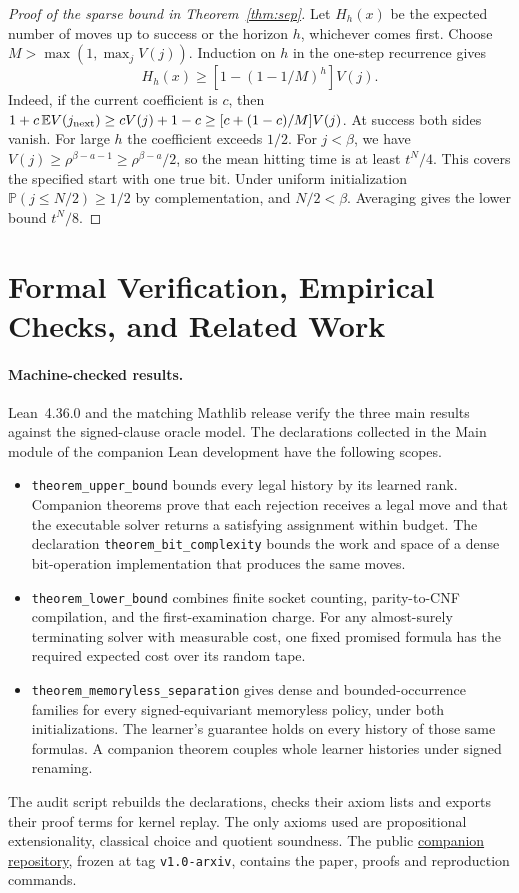 \documentclass[11pt,a4paper]{article}
\theoremstyle{definition}
\theoremstyle{remark}
\newcommand{\E}{\mathbb{E}}
\newcommand{\Prb}{\mathbb{P}}
\begin{document}
\begin{proof}[Proof of the sparse bound in Theorem~\ref{thm:sep}]
Let $H_h(x)$ be the expected number of moves up to success or the horizon $h$, whichever comes first. Choose $M>\max(1,\max_j V(j))$. Induction on $h$ in the one-step recurrence gives
\[
 H_h(x)\ge[1-(1-1/M)^h]V(j).
\]
Indeed, if the current coefficient is $c$, then $1+c\,\E V(j_{\rm next})\ge cV(j)+1-c\ge[c+(1-c)/M]V(j)$. At success both sides vanish. For large $h$ the coefficient exceeds $1/2$. For $j<\beta$, we have $V(j)\ge\rho^{\beta-a-1}\ge\rho^{\beta-a}/2$, so the mean hitting time is at least $t^N/4$. This covers the specified start with one true bit. Under uniform initialization $\Prb(j\le N/2)\ge1/2$ by complementation, and $N/2<\beta$. Averaging gives the lower bound $t^N/8$.
\end{proof}

\section{Formal Verification, Empirical Checks, and Related Work}\label{sec:verif}

\paragraph{Machine-checked results.}
Lean~4.36.0 and the matching Mathlib release verify the three main results against the signed-clause oracle model. The declarations collected in the Main module of the companion Lean development have the following scopes.
\begin{itemize}
\item \texttt{theorem\_upper\_bound} bounds every legal history by its learned rank. Companion theorems prove that each rejection receives a legal move and that the executable solver returns a satisfying assignment within budget. The declaration \texttt{theorem\_bit\_complexity} bounds the work and space of a dense bit-operation implementation that produces the same moves.
\item \texttt{theorem\_lower\_bound} combines finite socket counting, parity-to-CNF compilation, and the first-examination charge. For any almost-surely terminating solver with measurable cost, one fixed promised formula has the required expected cost over its random tape.
\item \texttt{theorem\_memoryless\_separation} gives dense and bounded-occurrence families for every signed-equivariant memoryless policy, under both initializations. The learner's guarantee holds on every history of those same formulas. A companion theorem couples whole learner histories under signed renaming.
\end{itemize}
The audit script rebuilds the declarations, checks their axiom lists and exports their proof terms for kernel replay. The only axioms used are propositional extensionality, classical choice and quotient soundness. The public \href{https://github.com/r4v3n-art/sat-feedback-movement}{companion repository}, frozen at tag \texttt{v1.0-arxiv}, contains the paper, proofs and reproduction commands.
\end{document}

